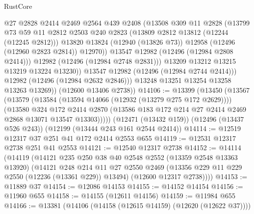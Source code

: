 \begin{lexlean}{RustCore}
\begin{coremodule}
                      @27
                      @2828
                      @2414
                      @2469
                      @2564
                      @439
                      @2408
                      (@13508
                        @309
                        @11
                        @2828
                        (@13799
                          @73
                          @59
                          @11
                          @2812
                          @2503
                          @240
                          @2823
                          (@13809 @2812 @13812 (@12244 (@12245 @2812)))
                          @13820
                          @13824
                          (@12940 (@13826 @73))
                          @12958
                          (@12496 (@12960 @2823 @2814))
                          @12970))
                      @13547
                      @12982
                      (@12496 (@12984 @2808 @2414)))
                    @12982
                    (@12496 (@12984 @2748 @2831)))
                  @13209
                  @13212
                  @13215
                  @13219
                  @13224
                  @13230))
              @13547
              @12982
              (@12496 (@12984 @2744 @2414)))
            @12982
            (@12496 (@12984 @2632 @2846)))
          @13248
          @13251
          @13254
          @13258
          @13263
          @13269))
      (@12600 @13406 @2738))
@14106 := @13399
    (@13450
      (@13567
        (@13579
          (@13584 (@13594 @14066 (@12932 (@13279 @275 @172 @2629))))
          (@13580
            @324
            @172
            @2414
            @2870
            (@13586 @183 @172 @214 @27 @2414 @2469 @2868 @13071 @13547 @13303)))))
    (@12471 (@13432 @159))
    (@12496 (@13437 @526 @243))
    (@12199 (@13444 @243 @161 @2544 @2414))
@14114 := @12519 @12317 @37 @251 @41 @172 @2414 @2553 @655
@14119 := @12531 @12317 @2738 @251 @41 @2553
@14121 := @12540 @12317 @2738
@14152 := @14114
    (@14119
      (@14121
        @235
        @250
        @38
        @40
        @2548
        @2552
        (@13359 @2548 @13363 @13920)
        (@14121
          @248
          @214
          @11
          @27
          @2550
          @2469
          (@13356 @229 @11 @229 @2550 (@12236 (@13361 @229)) @13494)
          (@12600 @12317 @2738))))
@14153 := @11889 @37
@14154 := @12086 @14153
@14155 := @14152 @14154
@14156 := @11960 @655
@14158 := @14155 (@12611 @14156)
@14159 := @11984 @655
@14166 := @13381 (@14106 (@14158 (@12615 @14159) (@12620 (@12622 @37))))

\end{coremodule}
\end{lexlean}
